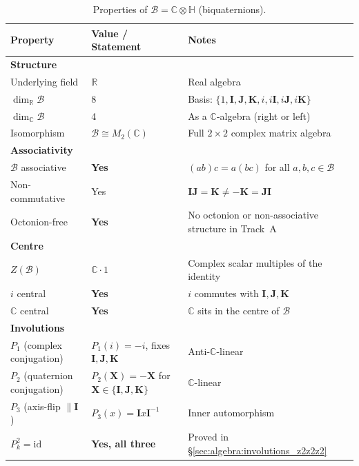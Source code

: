\begin{table}[h]
  \centering
  \caption{Properties of $\mathcal{B} = \mathbb{C}\otimes\mathbb{H}$ (biquaternions).}
  \label{tab:algebra:summary}
  \begin{tabular}{lll}
    \hline
    Property & Value / Statement & Notes \\
    \hline
    \multicolumn{3}{l}{\textbf{Structure}} \\
    Underlying field & $\mathbb{R}$ & Real algebra \\
    $\dim_\mathbb{R}\mathcal{B}$ & 8 & Basis: $\{1,\mathbf{I},\mathbf{J},\mathbf{K},i,i\mathbf{I},i\mathbf{J},i\mathbf{K}\}$ \\
    $\dim_\mathbb{C}\mathcal{B}$ & 4 & As a $\mathbb{C}$-algebra (right or left) \\
    Isomorphism & $\mathcal{B}\cong M_2(\mathbb{C})$ & Full $2\times 2$ complex matrix algebra \\
    \hline
    \multicolumn{3}{l}{\textbf{Associativity}} \\
    $\mathcal{B}$ associative & \textbf{Yes} & $(ab)c = a(bc)$ for all $a,b,c\in\mathcal{B}$ \\
    Non-commutative & Yes & $\mathbf{I}\mathbf{J} = \mathbf{K} \neq -\mathbf{K} = \mathbf{J}\mathbf{I}$ \\
    Octonion-free & \textbf{Yes} & No octonion or non-associative structure in Track~A \\
    \hline
    \multicolumn{3}{l}{\textbf{Centre}} \\
    $Z(\mathcal{B})$ & $\mathbb{C}\cdot 1$ & Complex scalar multiples of the identity \\
    $i$ central & \textbf{Yes} & $i$ commutes with $\mathbf{I},\mathbf{J},\mathbf{K}$ \\
    $\mathbb{C}$ central & \textbf{Yes} & $\mathbb{C}$ sits in the centre of $\mathcal{B}$ \\
    \hline
    \multicolumn{3}{l}{\textbf{Involutions}} \\
    $P_1$ (complex conjugation) & $P_1(i)=-i$, fixes $\mathbf{I},\mathbf{J},\mathbf{K}$ & Anti-$\mathbb{C}$-linear \\
    $P_2$ (quaternion conjugation) & $P_2(\mathbf{X})=-\mathbf{X}$ for $\mathbf{X}\in\{\mathbf{I},\mathbf{J},\mathbf{K}\}$ & $\mathbb{C}$-linear \\
    $P_3$ (axis-flip $\parallel\mathbf{I}$) & $P_3(x)=\mathbf{I}x\mathbf{I}^{-1}$ & Inner automorphism \\
    $P_k^2 = \mathrm{id}$ & \textbf{Yes, all three} & Proved in \S\ref{sec:algebra:involutions_z2z2z2} \\

\end{tabular}
\end{table}
